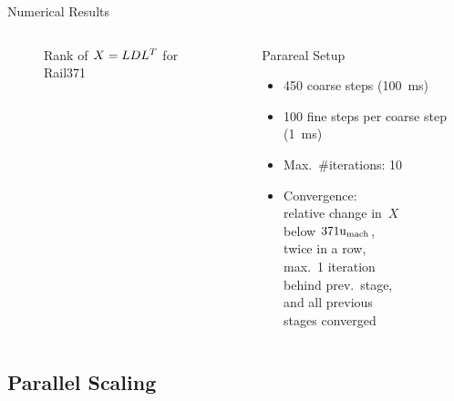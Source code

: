 \begin{frame}{Numerical Results}
\begin{columns}[onlytextwidth]
\begin{minipage}[b][0.75\textwidth][c]{\textwidth}
{\begin{figure}
  \caption{Rank of $X=LDL^T$ for Rail371}
  \end{figure}
}
  \end{minipage}
  \begin{block}{Parareal Setup}
    \begin{itemize}
      \item
        450 coarse steps (\SI{100}{\milli\second})
      \item
        100 fine steps per coarse step (\SI{1}{\milli\second})
      \item
        Max.~\#iterations: 10
      \item
        Convergence:\\
        relative change in~$X$\\ below $371\mathrm u_\text{mach}$,\\
        twice in a row,\\
        max.~1 iteration\\
        behind prev.~stage,\\
        and all previous\\
        stages converged
    \end{itemize}
  \end{block}
  \end{columns}
\end{frame}

\subsection{Parallel Scaling}

